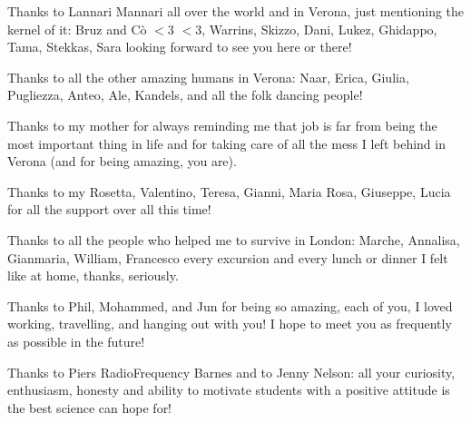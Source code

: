 Thanks to Lannari Mannari all over the world and in Verona, just mentioning the kernel of it: Bruz and Cò $<3$ $<3$, Warrins, Skizzo, Dani, Lukez, Ghidappo, Tama, Stekkas, Sara looking forward to see you here or there!

Thanks to all the other amazing humans in Verona: Naar, Erica, Giulia, Pugliezza, Anteo, Ale, Kandels, and all the folk dancing people!

Thanks to my mother for always reminding me that job is far from being the most important thing in life and for taking care of all the mess I left behind in Verona (and for being amazing, you are).

Thanks to my Rosetta, Valentino, Teresa, Gianni, Maria Rosa, Giuseppe, Lucia for all the support over all this time!

Thanks to all the people who helped me to survive in London: Marche, Annalisa, Gianmaria, William, Francesco every excursion and every lunch or dinner I felt like at home, thanks, seriously.

Thanks to Phil, Mohammed, and Jun for being so amazing, each of you, I loved working, travelling, and hanging out with you! I hope to meet you as frequently as possible in the future!

Thanks to Piers RadioFrequency \cite{Calado2018} Barnes and to Jenny Nelson: all your curiosity, enthusiasm, honesty and ability to motivate students with a positive attitude is the best science can hope for!